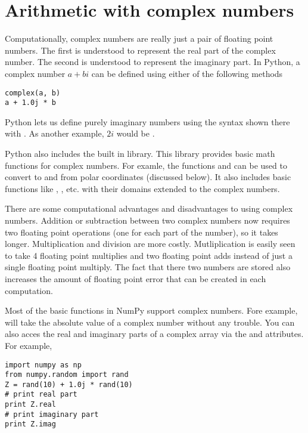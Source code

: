 \label{Lab:complex_intro}


\section*{Arithmetic with complex numbers}
Computationally, complex numbers are really just a pair of floating point numbers.
The first is understood to represent the real part of the complex number.
The second is understood to represent the imaginary part.
In Python, a complex number $a + b i$ can be defined using either of the following methods
\begin{lstlisting}
complex(a, b)
a + 1.0j * b
\end{lstlisting}
Python lets us define purely imaginary numbers using the syntax shown there with .
As another example, $2 i$ would be .

Python also includes the built in  library.
This library provides basic math functions for complex numbers.
For examle, the functions  and  can be used to convert to and from polar coordinates (discussed below).
It also includes basic functions like , , etc. with their domains extended to the complex numbers.

There are some computational advantages and disadvantages to using complex numbers.
Addition or subtraction between two complex numbers now requires two floating point operations (one for each part of the number), so it takes longer.
Multiplication and division are more costly.
Mutliplication is easily seen to take 4 floating point multiplies and two floating point adds instead of just a single floating point multiply.
The fact that there two numbers are stored also increases the amount of floating point error that can be created in each computation.

Most of the basic functions in NumPy support complex numbers.
Fore example,  will take the absolute value of a complex number without any trouble.
You can also acces the real and imaginary parts of a complex array via the  and  attributes.
For example,
\begin{lstlisting}
import numpy as np
from numpy.random import rand
Z = rand(10) + 1.0j * rand(10)
# print real part
print Z.real
# print imaginary part
print Z.imag
\end{lstlisting}

